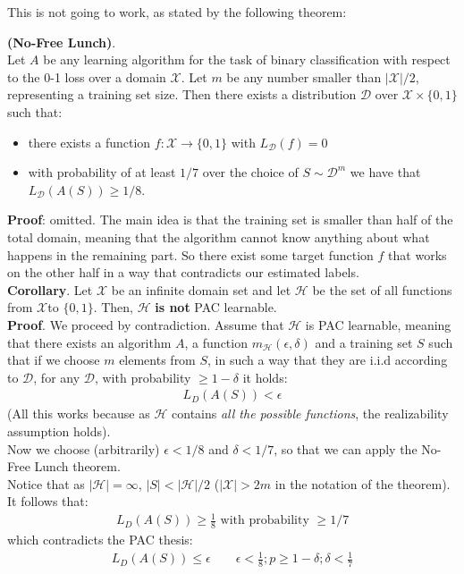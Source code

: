 \documentclass[../template.tex]{subfiles}
\begin{document}
This is not going to work, as stated by the following theorem:
\begin{thm} \textbf{(No-Free Lunch)}.\\ 
    Let $A$ be any learning algorithm for the task of binary classification with respect to the 0-1 loss over a domain $\mathcal{X}$. Let $m$ be any number smaller than $|\mathcal{X}|/2$, representing a training set size. Then there exists a distribution $\mathcal{D}$ over $\mathcal{X}\times \{0,1\}$ such that:
    \begin{itemize}
        \item there exists a function $f \colon \mathcal{X} \to \{0,1\}$ with $L_{\mathcal{D}}(f) = 0$
        \item with probability of at least $1/7$ over the choice of $S \sim \mathcal{D}^m$ we have that $L_{\mathcal{D}}(A(S)) \geq 1/8$.
    \end{itemize}    
\end{thm}
\textbf{Proof}: omitted. The main idea is that the training set is smaller than half of the total domain, meaning that the algorithm cannot know anything about what happens in the remaining part. So there exist some target function $f$ that works on the other half in a way that contradicts our estimated labels.\\

\textbf{Corollary}. Let $\mathcal{X}$ be an infinite domain set and let $\mathcal{H}$ be the set of all functions from $\mathcal{X}$to $\{0,1\}$. Then, $\mathcal{H}$ \textbf{is not} PAC learnable.\\
\textbf{Proof}. We proceed by contradiction. Assume that $\mathcal{H}$ is PAC learnable, meaning that there exists an algorithm $A$, a function $m_{\mathcal{H}}(\epsilon, \delta)$ and a training set $S$ such that if we choose $m$ elements from $S$, in such a way that they are i.i.d according to $\mathcal{D}$, for any $\mathcal{D}$, with probability $\geq 1- \delta$ it holds:
\begin{align*}
    L_D(A(S)) < \epsilon
\end{align*}
(All this works because as $\mathcal{H}$ contains \textit{all the possible functions}, the realizability assumption holds).\\
Now we choose (arbitrarily) $\epsilon < 1/8$ and $\delta < 1/7$, so that we can apply the No-Free Lunch theorem.\\
Notice that as $|\mathcal{H}| = \infty$, $|S| < |\mathcal{H}|/2$ ($|\mathcal{X}| > 2m$ in the notation of the theorem). It follows that:
\begin{align*}
    L_D(A(S)) \geq \frac{1}{8} \text{ with probability $\geq 1/7$} 
\end{align*}    
which contradicts the PAC thesis:
\begin{align*}
    L_D(A(S)) \leq \epsilon \qquad \epsilon < \frac{1}{8}; p \geq 1-\delta; \delta < \frac{1}{7} 
\end{align*}
\end{document}
